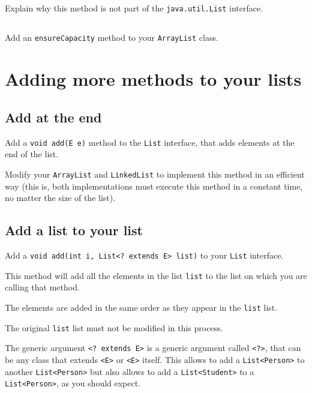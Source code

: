 \documentclass[a4paper, 11pt]{article}
\begin{document}
\subsection{}

Explain why this method is not part of the \verb+java.util.List+ interface.


\subsection{}

Add an \verb+ensureCapacity+ method to your \verb+ArrayList+ class.


\section{Adding more methods to your lists}

\subsection{Add at the end}

Add a \verb+void add(E e)+ method to the \verb+List+ interface, that adds elements at the end of the list.

Modify your \verb+ArrayList+ and \verb+LinkedList+ to implement this method in
an efficient way (this is, both implementations must execute this method in a
constant time, no matter the size of the list).


\subsection{Add a list to your list}

Add a \verb+void add(int i, List<? extends E> list)+ to your \verb+List+ interface.

This method will add all the elements in the list \verb+list+ to the list on which you are calling that method.

The elements are added in the same order as they appear in the \verb+list+ list.

The original \verb+list+ list must not be modified in this process.

The generic argument \verb+<? extends E>+ is a generic argument called
\verb+<?>+, that can be any class that extends \verb+<E>+ or \verb+<E>+ itself.
This allows to add a \verb+List<Person>+ to another \verb+List<Person>+ but
also allows to add a \verb+List<Student>+ to a \verb+List<Person>+, as you
should expect.
\end{document}
